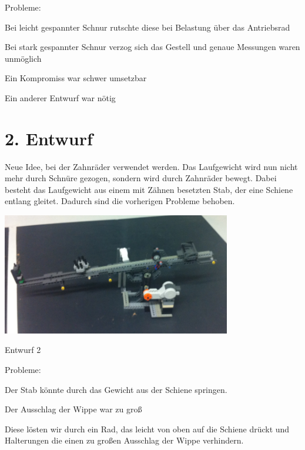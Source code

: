 Probleme\-:
\begin{DoxyItemize}
\item Bei leicht gespannter Schnur rutschte diese bei Belastung über das Antriebsrad
\item Bei stark gespannter Schnur verzog sich das Gestell und genaue Messungen waren unmöglich
\item Ein Kompromiss war schwer umsetzbar
\item Ein anderer Entwurf war nötig 
\end{DoxyItemize}\hypertarget{index_sec_4}{}\section{2. Entwurf}\label{index_sec_4}
Neue Idee, bei der Zahnräder verwendet werden. Das Laufgewicht wird nun nicht mehr durch Schnüre gezogen, sondern wird durch Zahnräder bewegt. Dabei besteht das Laufgewicht aus einem mit Zähnen besetzten Stab, der eine Schiene entlang gleitet. Dadurch sind die vorherigen Probleme behoben.

 
\begin{DoxyImage}
\includegraphics[width=10cm]{entwurf2.jpg}
\caption{Entwurf 2}
\end{DoxyImage}


Probleme\-:
\begin{DoxyItemize}
\item Der Stab könnte durch das Gewicht aus der Schiene springen.
\item Der Ausschlag der Wippe war zu groß
\end{DoxyItemize}

Diese lösten wir durch ein Rad, das leicht von oben auf die Schiene drückt und Halterungen die einen zu großen Ausschlag der Wippe verhindern.


